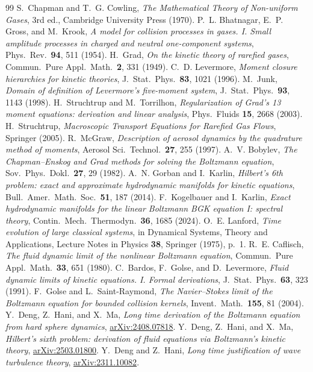 \begin{thebibliography}{99}
S.~Chapman and T.~G. Cowling,
\emph{The Mathematical Theory of Non-uniform Gases},
3rd ed., Cambridge University Press (1970).
P.~L. Bhatnagar, E.~P. Gross, and M.~Krook,
\emph{A model for collision processes in gases. I. Small amplitude processes
in charged and neutral one-component systems},
Phys.\ Rev.\ \textbf{94}, 511 (1954).
H.~Grad,
\emph{On the kinetic theory of rarefied gases},
Commun.\ Pure Appl.\ Math.\ \textbf{2}, 331 (1949).
C.~D. Levermore,
\emph{Moment closure hierarchies for kinetic theories},
J.\ Stat.\ Phys.\ \textbf{83}, 1021 (1996).
M.~Junk,
\emph{Domain of definition of Levermore's five-moment system},
J.\ Stat.\ Phys.\ \textbf{93}, 1143 (1998).
H.~Struchtrup and M.~Torrilhon,
\emph{Regularization of Grad's 13 moment equations: derivation and linear
analysis},
Phys.\ Fluids \textbf{15}, 2668 (2003).
H.~Struchtrup,
\emph{Macroscopic Transport Equations for Rarefied Gas Flows},
Springer (2005).
R.~McGraw,
\emph{Description of aerosol dynamics by the quadrature method of moments},
Aerosol Sci.\ Technol.\ \textbf{27}, 255 (1997).
A.~V. Bobylev,
\emph{The Chapman--Enskog and Grad methods for solving the Boltzmann
equation},
Sov.\ Phys.\ Dokl.\ \textbf{27}, 29 (1982).
A.~N. Gorban and I.~Karlin,
\emph{Hilbert's 6th problem: exact and approximate hydrodynamic manifolds
for kinetic equations},
Bull.\ Amer.\ Math.\ Soc.\ \textbf{51}, 187 (2014).
F.~Kogelbauer and I.~Karlin,
\emph{Exact hydrodynamic manifolds for the linear Boltzmann BGK equation I:
spectral theory},
Contin.\ Mech.\ Thermodyn.\ \textbf{36}, 1685 (2024).
O.~E. Lanford,
\emph{Time evolution of large classical systems},
in Dynamical Systems, Theory and Applications,
Lecture Notes in Physics \textbf{38}, Springer (1975), p.~1.
R.~E. Caflisch,
\emph{The fluid dynamic limit of the nonlinear Boltzmann equation},
Commun.\ Pure Appl.\ Math.\ \textbf{33}, 651 (1980).
C.~Bardos, F.~Golse, and D.~Levermore,
\emph{Fluid dynamic limits of kinetic equations. I. Formal derivations},
J.\ Stat.\ Phys.\ \textbf{63}, 323 (1991).
F.~Golse and L.~Saint-Raymond,
\emph{The Navier--Stokes limit of the Boltzmann equation for bounded
collision kernels},
Invent.\ Math.\ \textbf{155}, 81 (2004).
Y.~Deng, Z.~Hani, and X.~Ma,
\emph{Long time derivation of the Boltzmann equation from hard sphere
dynamics},
\href{https://arxiv.org/abs/2408.07818}{arXiv:2408.07818}.
Y.~Deng, Z.~Hani, and X.~Ma,
\emph{Hilbert's sixth problem: derivation of fluid equations via
Boltzmann's kinetic theory},
\href{https://arxiv.org/abs/2503.01800}{arXiv:2503.01800}.
Y.~Deng and Z.~Hani,
\emph{Long time justification of wave turbulence theory},
\href{https://arxiv.org/abs/2311.10082}{arXiv:2311.10082}.


\end{thebibliography}

